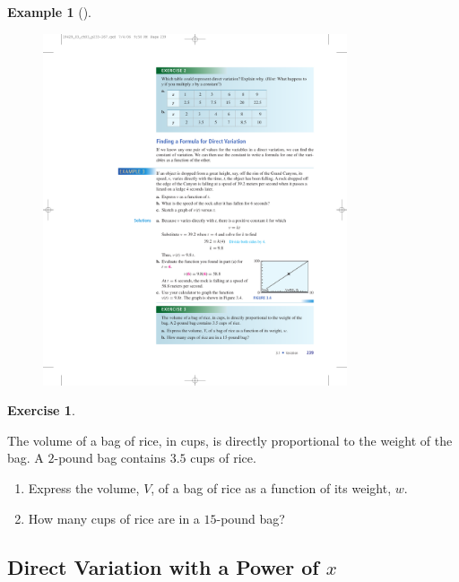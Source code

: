 \documentclass[10pt,]{book}
\theoremstyle{plain}
\theoremstyle{definition}
\theoremstyle{definition}
\theoremstyle{definition}
\newtheorem{example}[theorem]{Example}
\theoremstyle{definition}
\theoremstyle{definition}
\newtheorem{exercise}[theorem]{Exercise}
\numberwithin{equation}{section}
\begin{document}
\begin{example}[]
\begin{enumerate}[label=*\alph**]
\begin{figure}
\centering
\includegraphics[width=0.80\textwidth,]{images/fig-GC-falling-into-grand-canyon.pdf}\caption{\label{fig-GC-falling-into-grand-canyon}}
\end{figure}
\end{enumerate}
\end{example}
\begin{exercise}\label{exercise-rice}

	The volume of a bag of rice, in cups, is directly proportional to the weight of the bag. A \(2\)-pound bag contains \(3.5\) cups of rice.
	\leavevmode%
\begin{enumerate}[label=*\alph**]
\item\hypertarget{li-408}{}
			Express the volume, \(V\), of a bag of rice as a function of its weight, \(w\).
		\item\hypertarget{li-409}{}
			How many cups of rice are in a \(15\)-pound bag?
		\end{enumerate}
\end{exercise}
\typeout{************************************************}
\typeout{************************************************}
\subsection[Direct Variation with a Power of \(x\)]{Direct Variation with a Power of \(x\)}\label{subsection-59}
\end{document}
